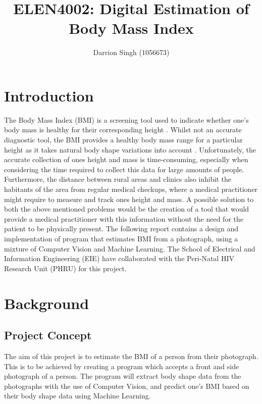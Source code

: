 \documentclass[conference]{IEEEtran}
\title{ELEN4002: Digital Estimation of Body Mass Index}
\author{Darrion Singh (1056673)}
\begin{document}
\maketitle

\begin{abstract}
	
\end{abstract}

\section{Introduction}
The Body Mass Index (BMI) is a screening tool used to indicate whether one's body mass is healthy for their corresponding height \cite{nhsBMI}.
Whilst not an accurate diagnostic tool, the BMI provides a healthy body mass range for a particular height as it takes natural body shape variations into account \cite{nhsBMI}.
Unfortunately, the accurate collection of ones height and mass is time-consuming, especially when considering the time required to collect this data for large amounts of people.
Furthermore, the distance between rural areas and clinics also inhibit the habitants of the area from regular medical checkups, where a medical practitioner might require to measure and track ones height and mass.
A possible solution to both the above mentioned problems would be the creation of a tool that would provide a medical practitioner with this information without the need for the patient to be physically present.
The following report contains a design and implementation of program that estimates BMI from a photograph, using a mixture of Computer Vision and Machine Learning.
The School of Electrical and Information Engineering (EIE) have collaborated with the Peri-Natal HIV Research Unit (PHRU) for this project.
\section{Background}
\subsection{Project Concept}
The aim of this project is to estimate the BMI of a person from their photograph.
This is to be achieved by creating a program which accepts a front and side photograph of a person.
The program will extract body shape data from the photographs with the use of Computer Vision, and predict one's BMI based on their body shape data using Machine Learning.
\end{document}
